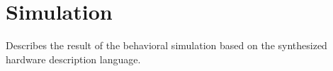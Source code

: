 \section{Simulation} \label{sec: Simulation}
Describes the result of the behavioral simulation based on the synthesized hardware description language.
%
%
%
%
